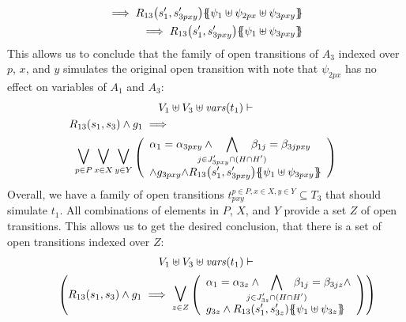 \documentclass[runningheads]{llncs}
\begin{document}
\begin{enumerate}
\begin{align*}
\implies R_{13}\mpar{s'_1,s'_{3pxy}}
\psubst{\psi_1 \uplus \psi_{2px} \uplus \psi_{3pxy}}  \\ 
\implies R_{13}\mpar{s'_1,s'_{3pxy}}\psubst{\psi_1  \uplus \psi_{3pxy}}
\end{align*}
This allows us to conclude that the family of open transitions of $A_3$ indexed over $p$, $x$,  and $y$ simulates the original open transition  with note that $\psi_{2px}$ has no effect on variables of $A_1$ and $A_3$:
\begin{multline*}
V_1  \uplus V_3  \uplus \fvars{t_1} \vdash\\
R_{13}(s_1,s_3)  \wedge g_1 \implies 
\hspace{5.5cm}\\
\operatorname*{\bigsymb{\bigvee}}_{p\in P}
\operatorname*{\bigsymb{\bigvee}}_{x \in X} 
\operatorname*{\bigsymb{\bigvee}}_{y \in Y}
\mpar{\everymath{\displaystyle}
\begin{array}{l}
\alpha_1=\alpha_{3pxy}\wedge \bigwedge_\subbox{j \in J'_{3pxy} \cap (H\cap H')} \beta_{1j}=\beta_{3jpxy} \\ \wedge g_{3pxy} 
{\wedge R_{13}\mpar{s'_1,s'_{3pxy}}}\psubst{\psi_1  \uplus \psi_{3pxy}}
\end{array}}
\end{multline*}
Overall, we have a family of open transitions $t^{p\in P,x\in X,y\in Y}_{pxy} \subseteq T_3$ that should simulate $t_1$. All  combinations of elements in $P$, $X$, and $Y$ provide a set $Z$ of  open transitions.  This allows us to get the desired conclusion, that there is a set of  open transitions indexed over $Z$:
\begin{multline*}
V_1 \uplus  V_3 \uplus \fvars{t_1}
\vdash\\\hspace{2em}
\mpar{R_{13}\mpar{s_1, s_3} \wedge g_1 \implies 
\operatorname*{\bigsymb{\bigvee}}_{z \in Z}
\mpar{\everymath{\displaystyle}
\begin{array}{l}
\alpha_1=\alpha_{3z}\wedge \bigwedge_\subbox{j \in J'_{3z} \cap (H\cap H')} \beta_{1j}=\beta_{3jz} \wedge \\g_{3z}\wedge 
{R_{13}\mpar{s'_1,s'_{3z}}}\psubst{\psi_1  \uplus \psi_{3z}}
\end{array}}}
\end{multline*}	


\end{enumerate}
\end{document}
